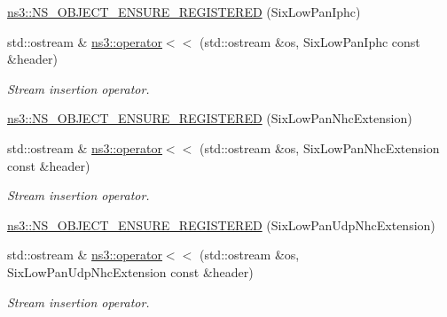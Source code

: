 \begin{DoxyCompactItemize}
\hyperlink{namespacens3_a50a261a87384dd3e77c3322af4a8a5b8}{ns3\+::\+N\+S\+\_\+\+O\+B\+J\+E\+C\+T\+\_\+\+E\+N\+S\+U\+R\+E\+\_\+\+R\+E\+G\+I\+S\+T\+E\+R\+ED} (Six\+Low\+Pan\+Iphc)
\item 
std\+::ostream \& \hyperlink{namespacens3_a22c6d875c65b3f803c4ba5a02e35db5b}{ns3\+::operator$<$$<$} (std\+::ostream \&os, Six\+Low\+Pan\+Iphc const \&header)
\begin{DoxyCompactList}\small\item\em Stream insertion operator. \end{DoxyCompactList}\item 
\hyperlink{namespacens3_a0a3a1849af4deb3814cbae7fea4cdb2e}{ns3\+::\+N\+S\+\_\+\+O\+B\+J\+E\+C\+T\+\_\+\+E\+N\+S\+U\+R\+E\+\_\+\+R\+E\+G\+I\+S\+T\+E\+R\+ED} (Six\+Low\+Pan\+Nhc\+Extension)
\item 
std\+::ostream \& \hyperlink{namespacens3_a26ce9048762f58b5cfb3575bf1f6cb1f}{ns3\+::operator$<$$<$} (std\+::ostream \&os, Six\+Low\+Pan\+Nhc\+Extension const \&header)
\begin{DoxyCompactList}\small\item\em Stream insertion operator. \end{DoxyCompactList}\item 
\hyperlink{namespacens3_a0a6968ba12d26cb1eb40f587baf7995b}{ns3\+::\+N\+S\+\_\+\+O\+B\+J\+E\+C\+T\+\_\+\+E\+N\+S\+U\+R\+E\+\_\+\+R\+E\+G\+I\+S\+T\+E\+R\+ED} (Six\+Low\+Pan\+Udp\+Nhc\+Extension)
\item 
std\+::ostream \& \hyperlink{namespacens3_af672868ddbf6ab2d2987858cfa1cc1bb}{ns3\+::operator$<$$<$} (std\+::ostream \&os, Six\+Low\+Pan\+Udp\+Nhc\+Extension const \&header)
\begin{DoxyCompactList}\small\item\em Stream insertion operator. \end{DoxyCompactList}\end{DoxyCompactItemize}
